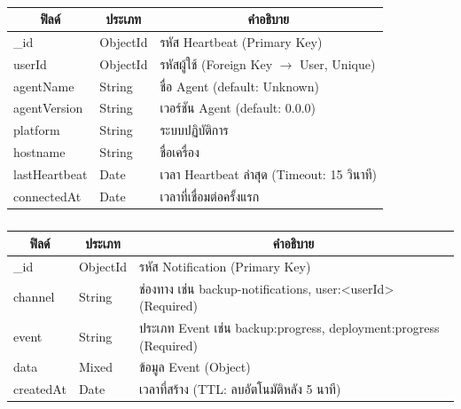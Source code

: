 \begin{table}[H]
    \caption{}
    \label{tab:agent-heartbeat-structure}
    \fontSixTeen 
    \begin{tabularx}{\textwidth}{|l|l|X|} 
        \hline
        \multicolumn{1}{|c|}{\textbf{ฟิลด์}} & \multicolumn{1}{c|}{\textbf{ประเภท}} & \multicolumn{1}{c|}{\textbf{คำอธิบาย}} \\
        \hline
        \_id & ObjectId & รหัส Heartbeat (Primary Key) \\
        \hline
        userId & ObjectId & รหัสผู้ใช้ (Foreign Key $\rightarrow$ User, Unique) \\
        \hline
        agentName & String & ชื่อ Agent (default: Unknown) \\
        \hline
        agentVersion & String & เวอร์ชัน Agent (default: 0.0.0) \\
        \hline
        platform & String & ระบบปฏิบัติการ \\
        \hline
        hostname & String & ชื่อเครื่อง \\
        \hline
        lastHeartbeat & Date & เวลา Heartbeat ล่าสุด (Timeout: 15 วินาที) \\
        \hline
        connectedAt & Date & เวลาที่เชื่อมต่อครั้งแรก \\
        \hline
    \end{tabularx}
\end{table}


\begin{table}[H]
    \caption{}
    \label{tab:notification-structure}
    \fontSixTeen 
    \begin{tabularx}{\textwidth}{|l|l|X|} 
        \hline
        \multicolumn{1}{|c|}{\textbf{ฟิลด์}} & \multicolumn{1}{c|}{\textbf{ประเภท}} & \multicolumn{1}{c|}{\textbf{คำอธิบาย}} \\
        \hline
        \_id & ObjectId & รหัส Notification (Primary Key) \\
        \hline
        channel & String & ช่องทาง เช่น backup-notifications, user:<userId> (Required) \\
        \hline
        event & String & ประเภท Event เช่น backup:progress, deployment:progress (Required) \\
        \hline
        data & Mixed & ข้อมูล Event (Object) \\
        \hline
        createdAt & Date & เวลาที่สร้าง (TTL: ลบอัตโนมัติหลัง 5 นาที) \\
        \hline
    \end{tabularx}
\end{table}

